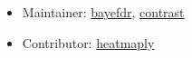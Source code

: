 \begin{itemize}
  \item
    Maintainer: \href{https://github.com/Alanocallaghan/bayefdr}{bayefdr}, \href{https://github.com/Alanocallaghan/contrast}{contrast}
  \item
    Contributor: \href{https://talgalili.github.io/heatmaply/}{heatmaply}
\end{itemize}
